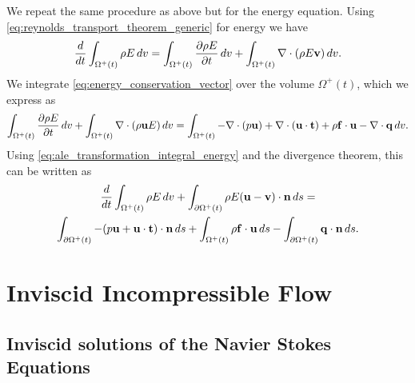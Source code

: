 \documentclass[oneside,a4paper,11pt]{report}
\begin{document}
We repeat the same procedure as above but for the energy equation. Using \cref{eq:reynolds_transport_theorem_generic} for energy we have
\begin{equation}
\label{eq:ale_transformation_integral_energy}
    \frac{d}{dt} \int_{\Omega^+(t)} \rho E \, dv = \int_{\Omega^+(t)} \frac{\partial \rho E}{\partial t} \, dv + \int_{\Omega^+(t)} \nabla \cdot (\rho E \mathbf{v}) \, dv.
\end{equation}
We integrate \cref{eq:energy_conservation_vector} over the volume $\Omega^+(t)$, which we express as
\begin{equation}
    \int_{\Omega^+(t)} \frac{\partial \rho E}{\partial t} \, dv + \int_{\Omega^+(t)} \nabla \cdot (\rho \mathbf{u} E) \, dv = \int_{\Omega^+(t)} -\nabla \cdot (p\mathbf{u}) + \nabla \cdot (\mathbf{u} \cdot \mathbf{t}) + \rho \mathbf{f} \cdot \mathbf{u} - \nabla \cdot \mathbf{q} \, dv.
\end{equation}
Using \cref{eq:ale_transformation_integral_energy} and the divergence theorem, this can be written as
\begin{multline}
    \frac{d}{dt} \int_{\Omega^+(t)} \rho E \, dv + \int_{\partial \Omega^+(t)} \rho E (\mathbf{u} - \mathbf{v}) \cdot \mathbf{n} \, ds = \\
    \int_{\partial \Omega^+(t)} -(p\mathbf{u} + \mathbf{u} \cdot \mathbf{t}) \cdot \mathbf{n} \, ds + \int_{\Omega^+(t)} \rho \mathbf{f} \cdot \mathbf{u} \, ds - \int_{\partial \Omega^+(t)} \mathbf{q} \cdot \mathbf{n} \, ds.
\end{multline}

\part{Inviscid Incompressible Flow}                                           %

%	
\chapter{Inviscid solutions of the Navier Stokes Equations}
%
\end{document}
